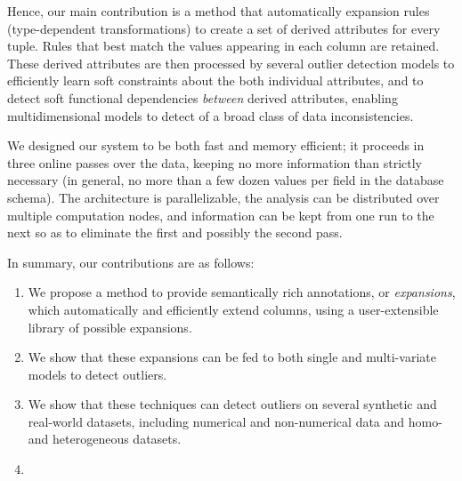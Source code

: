 Hence, our main contribution is a method that automatically expansion rules (type-dependent transformations) to create a set of derived attributes for every tuple. Rules that best match the values appearing in each column are retained.
These derived attributes are then processed by several outlier detection models to efficiently learn soft constraints about the both individual attributes, and to detect soft functional dependencies {\it between} derived attributes, enabling multidimensional models to detect of a broad class of data inconsistencies. 



We designed our system to be both fast and memory efficient; it proceeds in three online passes over the data, keeping no more information than strictly necessary (in general, no more than a few dozen values per field in the database schema). The architecture is parallelizable, the analysis can be distributed over multiple computation nodes, and information can be kept from one run to the next so as to eliminate the first and possibly the second pass.


In summary, our contributions are as follows:
\begin{enumerate}
\item We propose a method to provide semantically rich annotations, or \emph{expansions}, which automatically and efficiently extend columns, using a user-extensible library of possible expansions.
\item We show that these expansions can be fed to both single and multi-variate models to detect outliers.
\item We show that these techniques can detect outliers on several synthetic and real-world datasets, including 
 numerical and non-numerical data and homo- and heterogeneous datasets.
\item 
\end{enumerate}

